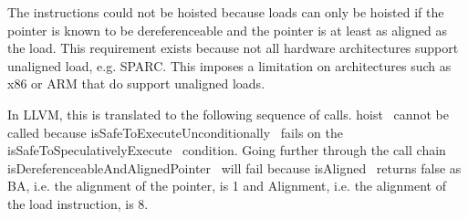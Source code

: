 The instructions could not be hoisted because loads can only be hoisted if the
pointer is known to be dereferenceable and the pointer is at least as aligned as
the load. This requirement exists because not all hardware architectures support
unaligned load, e.g. SPARC. This imposes a limitation on architectures such as
x86 or ARM that do support unaligned loads.

In LLVM, this is translated to the following sequence of calls.
hoist~\cite{hoist} cannot be called because
isSafeToExecuteUnconditionally~\cite{isSafeToExecuteUnconditionally} fails on
the isSafeToSpeculativelyExecute~\cite{isSafeToSpeculativelyExecute} condition.
Going further through the call chain
isDereferenceableAndAlignedPointer~\cite{isDereferenceableAndAlignedPointer}
will fail because isAligned~\cite{isAligned} returns false as BA, i.e. the
alignment of the pointer, is 1 and Alignment, i.e. the alignment of the
load instruction, is 8.
